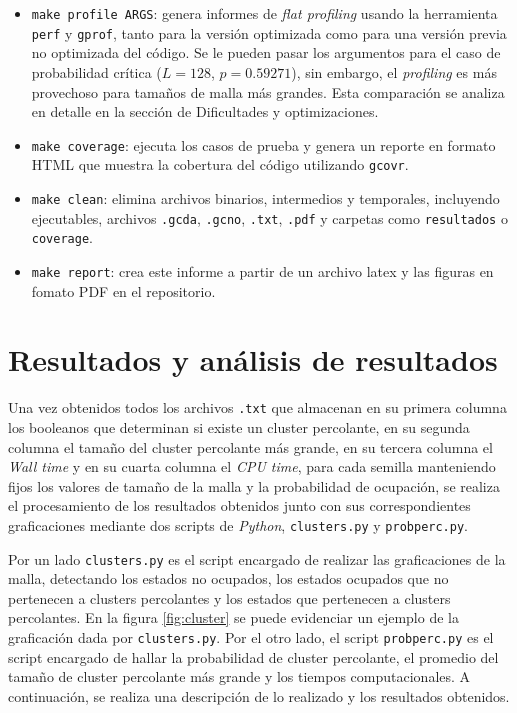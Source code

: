 \documentclass[%
 reprint,
 amsmath,amssymb,
 aps,
]{revtex4-2}
\begin{document}
\begin{itemize}
    \item \texttt{make profile ARGS}: genera informes de \textit{flat profiling} usando la herramienta \texttt{perf}\cite{perf} y \texttt{gprof}\cite{gprof}, tanto para la versión optimizada como para una versión previa no optimizada del código. Se le pueden pasar los argumentos para el caso de probabilidad crítica (\( L = 128 \), \( p = 0.59271 \)), sin embargo, el \textit{profiling} es más provechoso para tamaños de malla más grandes. Esta comparación se analiza en detalle en la sección de Dificultades y optimizaciones.
    
    \item \texttt{make coverage}: ejecuta los casos de prueba y genera un reporte en formato HTML que muestra la cobertura del código utilizando \texttt{gcovr}\cite{gcovr}.
    
    \item \texttt{make clean}: elimina archivos binarios, intermedios y temporales, incluyendo ejecutables, archivos \texttt{.gcda}, \texttt{.gcno}, \texttt{.txt}, \texttt{.pdf} y carpetas como \texttt{resultados} o \texttt{coverage}.

    \item \texttt{make report}: crea este informe a partir de un archivo latex y las figuras en fomato PDF en el repositorio.
    
\end{itemize}

\section{Resultados y análisis de resultados}

Una vez obtenidos todos los archivos \texttt{.txt} que almacenan en su primera columna los booleanos que determinan si existe un cluster percolante, en su segunda columna el tamaño del cluster percolante más grande, en su tercera columna el \textit{Wall time} y en su cuarta columna el \textit{CPU time}, para cada semilla manteniendo fijos los valores de tamaño de la malla y la probabilidad de ocupación, se realiza el procesamiento de los resultados obtenidos junto con sus correspondientes graficaciones mediante dos scripts de \textit{Python}, \texttt{clusters.py} y \texttt{probperc.py}.
\vspace{0.2 cm}

Por un lado \texttt{clusters.py} es el script encargado de realizar las graficaciones de la malla, detectando los estados no ocupados, los estados ocupados que no pertenecen a clusters percolantes y los estados que pertenecen a clusters percolantes. En la figura \ref{fig:cluster} se puede evidenciar un ejemplo de la graficación dada por \texttt{clusters.py}. Por el otro lado, el script \texttt{probperc.py} es el script encargado de hallar la probabilidad de cluster percolante, el promedio del tamaño de cluster percolante más grande y los tiempos computacionales. A continuación, se realiza una descripción de lo realizado y los resultados obtenidos.
\end{document}
